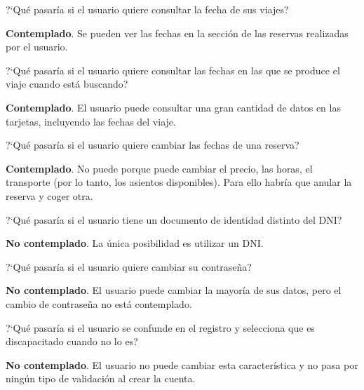 \begin{escenario} %
  \centering
?`Qué pasaría si el usuario quiere consultar la fecha de sus viajes?

\begin{solucion}
  \centering
  \textbf{Contemplado}. Se pueden ver las fechas en la sección de las reservas realizadas por el usuario.
\end{solucion}
\end{escenario}

\begin{escenario} %
  \centering
?`Qué pasaría si el usuario quiere consultar las fechas en las que se produce el viaje cuando está buscando?

\begin{solucion}
  \centering
  \textbf{Contemplado}. El usuario puede consultar una gran cantidad de datos en las tarjetas, incluyendo las fechas del viaje.
\end{solucion}
\end{escenario}

\begin{escenario} %
  \centering
?`Qué pasaría si el usuario quiere cambiar las fechas de una reserva?

\begin{solucion}
  \centering
  \textbf{Contemplado}. No puede porque puede cambiar el precio, las horas, el transporte (por lo tanto, los asientos disponibles). Para ello habría que anular la reserva y coger otra.
\end{solucion}
\end{escenario}

\begin{escenario} %
    \centering
  ?`Qué pasaría si el usuario tiene un documento de identidad distinto del DNI?
  
\begin{solucion}
    \centering
    \textbf{No contemplado}. La única posibilidad es utilizar un DNI.
\end{solucion}
\end{escenario}

\begin{escenario} %
    \centering
  ?`Qué pasaría si el usuario quiere cambiar su contraseña?
  
\begin{solucion}
    \centering
    \textbf{No contemplado}. El usuario puede cambiar la mayoría de sus datos, pero el cambio de contraseña no está contemplado.
\end{solucion}
\end{escenario}

\begin{escenario} %
    \centering
  ?`Qué pasaría si el usuario se confunde en el registro y selecciona que es discapacitado cuando no lo es?
  
\begin{solucion}
    \centering
    \textbf{No contemplado}. El usuario no puede cambiar esta característica y no pasa por ningún tipo de validación al crear la cuenta.
\end{solucion}
\end{escenario}